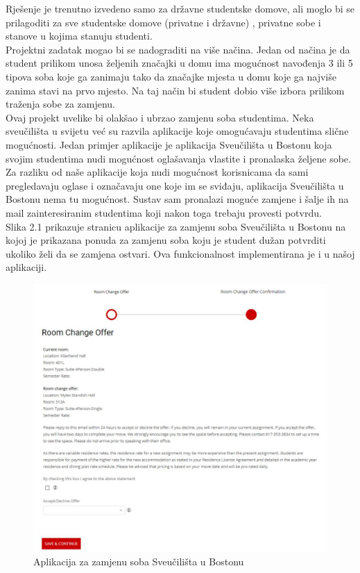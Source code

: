 Rješenje je trenutno izvedeno samo za državne studentske domove, ali moglo bi se prilagoditi za sve studentske domove (privatne i državne) , privatne sobe i stanove u kojima stanuju studenti.\\

Projektni zadatak mogao bi se nadograditi na više načina. Jedan od načina je da student prilikom unosa željenih značajki u domu ima mogućnost navođenja 3 ili 5 tipova soba koje ga zanimaju  tako da značajke mjesta u domu koje ga najviše zanima stavi na prvo mjesto. Na taj način bi student dobio više izbora prilikom traženja sobe za zamjenu. \\

Ovaj projekt uvelike bi olakšao i ubrzao zamjenu soba studentima. Neka sveučilišta u svijetu već su razvila aplikacije koje omogućavaju studentima slične mogućnosti. Jedan primjer aplikacije je aplikacija Sveučilišta u Bostonu koja svojim studentima nudi mogućnost oglašavanja vlastite i pronalaska željene sobe. Za razliku od naše aplikacije koja nudi mogućnost korisnicama da sami pregledavaju oglase i označavaju one koje im se sviđaju, aplikacija Sveučilišta u Bostonu nema tu mogućnost. Sustav sam pronalazi moguće zamjene i šalje ih na mail zainteresiranim studentima koji nakon toga trebaju provesti potvrdu. \\

Slika 2.1 prikazuje stranicu aplikacije za zamjenu soba Sveučilišta u Bostonu na kojoj je prikazana ponuda za zamjenu soba koju je student dužan potvrditi ukoliko želi da se zamjena ostvari. Ova funkcionalnost implementirana je i u našoj aplikaciji.

		\begin{figure}[H]
			\includegraphics[scale=0.4]{slike/pic1.JPG} %
			\centering
			\caption{Aplikacija za zamjenu soba Sveučilišta u Bostonu}
			\label{fig:promjene1}
		\end{figure}

	